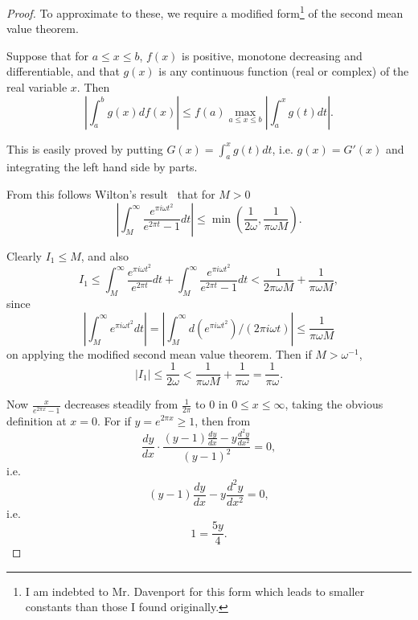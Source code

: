 \documentclass[12pt]{article}
\theoremstyle{remark}
\begin{document}
\begin{proof}
To approximate to these, we require a modified form\footnote{I am indebted to Mr. Davenport for this form which leads to smaller constants than those I found originally.} of the second mean value theorem.

Suppose that for $a \leq x \leq b$, $f(x)$ is positive, monotone decreasing and differentiable, and that $g(x)$ is any continuous function (real or complex) of the real variable $x$. Then
\begin{equation}\label{eq:second_mean_value}
\left|\int_a^b g(x) df(x)\right| \leq f(a) \max_{a \leq x \leq b} \left|\int_a^x g(t) dt\right|.
\end{equation}

This is easily proved by putting $G(x) = \int_a^x g(t) dt$, i.e. $g(x) = G'(x)$ and integrating the left hand side by parts.

From this follows Wilton's result~\cite{Wilton1927} that for $M > 0$
\begin{equation}\label{eq:wilton_bound}
\left|\int_M^\infty \frac{e^{\pi i\omega t^2}}{e^{2\pi t} - 1} dt\right| \leq \min\left(\frac{1}{2\omega}, \frac{1}{\pi\omega M}\right).
\end{equation}

Clearly $I_1 \leq M$, and also
\begin{equation}\label{eq:I1_bound}
I_1 \leq \int_M^\infty \frac{e^{\pi i\omega t^2}}{e^{2\pi t}} dt + \int_M^\infty \frac{e^{\pi i\omega t^2}}{e^{2\pi t} - 1} dt < \frac{1}{2\pi\omega M} + \frac{1}{\pi\omega M},
\end{equation}
since
\begin{equation}\label{eq:integral_bound}
\left|\int_M^\infty e^{\pi i\omega t^2} dt\right| = \left|\int_M^\infty d(e^{\pi i\omega t^2})/(2\pi i\omega t)\right| \leq \frac{1}{\pi\omega M}
\end{equation}
on applying the modified second mean value theorem. Then if $M > \omega^{-1}$,
\begin{equation}\label{eq:combined_bound}
|I_1| \leq \frac{1}{2\omega} < \frac{1}{\pi\omega M} + \frac{1}{\pi\omega} = \frac{1}{\pi\omega}.
\end{equation}

Now $\frac{x}{e^{2\pi x} - 1}$ decreases steadily from $\frac{1}{2\pi}$ to $0$ in $0 \leq x \leq \infty$, taking the obvious definition at $x = 0$. For if $y = e^{2\pi x} \geq 1$, then from
\begin{equation}\label{eq:derivative_condition}
\frac{dy}{dx} \cdot \frac{(y-1) \frac{dy}{dx} - y \frac{d^2y}{dx^2}}{(y-1)^2} = 0,
\end{equation}
i.e.
\begin{equation}\label{eq:simplified_condition}
(y-1) \frac{dy}{dx} - y \frac{d^2y}{dx^2} = 0,
\end{equation}
i.e.
\begin{equation}\label{eq:y_condition}
1 = \frac{5y}{4}.
\end{equation}


\end{proof}
\end{document}
